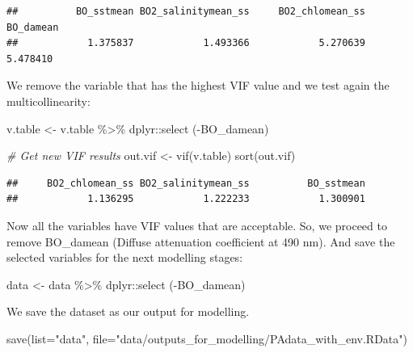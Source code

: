 \documentclass[
]{book}
\newenvironment{Shaded}{\begin{snugshade}}{\end{snugshade}}
\newcommand{\AttributeTok}[1]{\textcolor[rgb]{0.77,0.63,0.00}{#1}}
\newcommand{\CommentTok}[1]{\textcolor[rgb]{0.56,0.35,0.01}{\textit{#1}}}
\newcommand{\FunctionTok}[1]{\textcolor[rgb]{0.00,0.00,0.00}{#1}}
\newcommand{\NormalTok}[1]{#1}
\newcommand{\OtherTok}[1]{\textcolor[rgb]{0.56,0.35,0.01}{#1}}
\newcommand{\SpecialCharTok}[1]{\textcolor[rgb]{0.00,0.00,0.00}{#1}}
\newcommand{\StringTok}[1]{\textcolor[rgb]{0.31,0.60,0.02}{#1}}
\begin{document}
\begin{verbatim}
##          BO_sstmean BO2_salinitymean_ss     BO2_chlomean_ss           BO_damean 
##            1.375837            1.493366            5.270639            5.478410
\end{verbatim}

We remove the variable that has the highest VIF value and we test again the multicollinearity:

\begin{Shaded}
\begin{Highlighting}[]
\NormalTok{v.table }\OtherTok{\textless{}{-}}\NormalTok{ v.table }\SpecialCharTok{\%\textgreater{}\%} 
\NormalTok{  dplyr}\SpecialCharTok{::}\FunctionTok{select}\NormalTok{ (}\SpecialCharTok{{-}}\NormalTok{BO\_damean)}

\CommentTok{\# Get new VIF results}
\NormalTok{out.vif }\OtherTok{\textless{}{-}} \FunctionTok{vif}\NormalTok{(v.table)}
\FunctionTok{sort}\NormalTok{(out.vif)}
\end{Highlighting}
\end{Shaded}

\begin{verbatim}
##     BO2_chlomean_ss BO2_salinitymean_ss          BO_sstmean 
##            1.136295            1.222233            1.300901
\end{verbatim}

Now all the variables have VIF values that are acceptable. So, we proceed to remove BO\_damean (Diffuse attenuation coefficient at 490 nm). And save the selected variables for the next modelling stages:

\begin{Shaded}
\begin{Highlighting}[]
\NormalTok{data }\OtherTok{\textless{}{-}}\NormalTok{ data }\SpecialCharTok{\%\textgreater{}\%}\NormalTok{ dplyr}\SpecialCharTok{::}\FunctionTok{select}\NormalTok{ (}\SpecialCharTok{{-}}\NormalTok{BO\_damean)}
\end{Highlighting}
\end{Shaded}

We save the dataset as our output for modelling.

\begin{Shaded}
\begin{Highlighting}[]
\FunctionTok{save}\NormalTok{(}\AttributeTok{list=}\StringTok{"data"}\NormalTok{, }\AttributeTok{file=}\StringTok{"data/outputs\_for\_modelling/PAdata\_with\_env.RData"}\NormalTok{)}
\end{Highlighting}
\end{Shaded}
\end{document}
